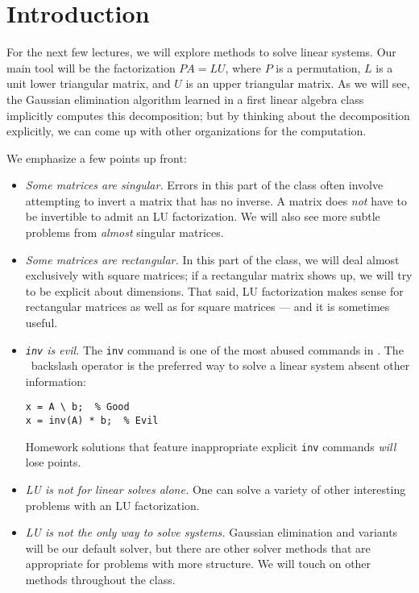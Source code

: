 \documentclass[12pt, leqno]{article} %
\begin{document}

\section{Introduction}

For the next few lectures, we will explore methods to solve linear
systems.  Our main tool will be the factorization $PA = LU$, where
$P$ is a permutation, $L$ is a unit lower triangular matrix, and $U$ is
an upper triangular matrix.  As we will see, the Gaussian elimination
algorithm learned in a first linear algebra class implicitly computes
this decomposition; but by thinking about the decomposition explicitly,
we can come up with other organizations for the computation.

We emphasize a few points up front:
\begin{itemize}
\item {\em Some matrices are singular.}  Errors in this part of the class
  often involve attempting to invert a matrix that has no inverse.
  A matrix does {\em not} have to be invertible to admit an LU factorization.
  We will also see more subtle problems from {\em almost} singular matrices.
\item {\em Some matrices are rectangular.}  In this part of the class,
  we will deal almost exclusively with square matrices; if a rectangular
  matrix shows up, we will try to be explicit about dimensions.  That
  said, LU factorization makes sense for rectangular matrices as well
  as for square matrices --- and it is sometimes useful.
\item {\em {\tt inv} is evil.}  The {\tt inv} command is one of the most
  abused commands in \matlab.  The \matlab\ backslash operator is the
  preferred way to solve a linear system absent other information:
\begin{lstlisting}
x = A \ b;  % Good
x = inv(A) * b;  % Evil
\end{lstlisting}
  Homework solutions that feature inappropriate explicit {\tt inv}
  commands {\em will} lose points.
\item {\em LU is not for linear solves alone.}  One can solve a variety
  of other interesting problems with an LU factorization.
\item {\em LU is not the only way to solve systems.}  Gaussian elimination
  and variants will be our default solver, but there are other solver
  methods that are appropriate for problems with more structure.
  We will touch on other methods throughout the class.
\end{itemize}
\end{document}
